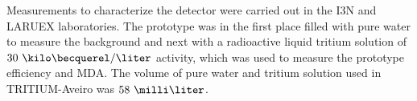Measurements to characterize the detector were carried out in the I3N and LARUEX laboratories. The prototype was in the first place filled with pure water to measure the background and next with a radioactive liquid tritium solution of $30~\kilo\becquerel/\liter$ activity, which was used to measure the prototype efficiency and MDA. The volume of pure water and tritium solution used in TRITIUM-Aveiro was $58~\milli\liter$. 






